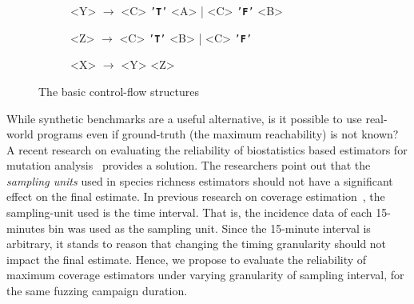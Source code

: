 \documentclass[conference]{IEEEtran}
\def\term#1{\texttt{'\textbf{#1}'}}
\begin{document}
\begin{figure*}
\begin{subfigure}[h]{0.3\textwidth}
\begin{grammar}\centering
    <Y> $\rightarrow$ <C> \term{T} <A> | <C> \term{F} <B>
\end{grammar}
\end{subfigure}
\begin{subfigure}[h]{0.3\textwidth}
\begin{grammar}\centering
  <Z> $\rightarrow$ <C> \term{T} <B> | <C> \term{F}
\end{grammar}
\end{subfigure}
\begin{subfigure}[h]{0.3\textwidth}
\begin{grammar}\centering
  <X> $\rightarrow$ <Y> <Z>
\end{grammar}
\end{subfigure}
%
\caption{The basic control-flow structures}
\label{fig:cfg}
\end{figure*}

While synthetic benchmarks are a useful alternative, is it possible to use
real-world programs even if ground-truth (the maximum reachability) is not
known? A recent research on evaluating the reliability of biostatistics based
estimators for mutation analysis~\cite{Kuznetsov2024empirical} provides a
solution. The researchers point out that the \emph{sampling units} used in
species richness estimators should not have a significant effect on the final
estimate. In previous research on coverage estimation~\cite{liyanage2023reachable},
the sampling-unit used is the time interval. That is, the incidence data of
each 15-minutes bin was used as the sampling unit. Since the 15-minute interval
is arbitrary, it stands to reason that changing the timing granularity should
not impact the final estimate. Hence, we propose to evaluate the reliability of
maximum coverage estimators under varying granularity of sampling interval,
for the same fuzzing campaign duration.

\end{document}
